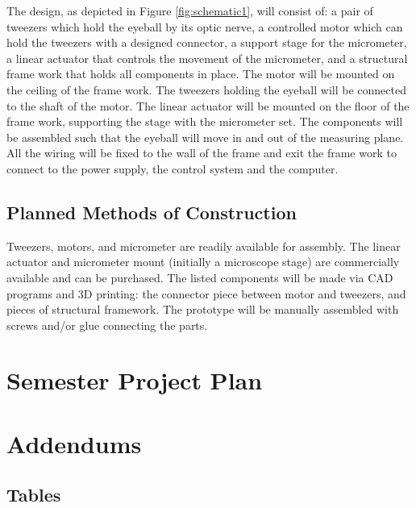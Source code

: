 \documentclass{article}
\begin{document}
The design, as depicted in Figure \ref{fig:schematic1}, will consist of: a pair of tweezers which hold the eyeball by its optic nerve, a controlled motor which can hold the tweezers with a designed connector, a support stage for the micrometer, a linear actuator that controls the movement of the micrometer, and a structural frame work that holds all components in place. The motor will be mounted on the ceiling of the frame work. The tweezers holding the eyeball will be connected to the shaft of the motor. The linear actuator will be mounted on the floor of the frame work, supporting the stage with the micrometer set. The components will be assembled such that the eyeball will move in and out of the measuring plane. All the wiring will be fixed to the wall of the frame and exit the frame work to connect to the power supply, the control system and the computer.

\subsection{Planned Methods of Construction}
Tweezers, motors, and micrometer are readily available for assembly. The linear actuator and micrometer mount (initially a microscope stage) are commercially available and can be purchased. The listed components will be made via CAD programs and 3D printing: the connector piece between motor and tweezers, and pieces of structural framework. The prototype will be manually assembled with screws and/or glue connecting the parts.

\section{Semester Project Plan}

\newpage


\newpage

\section{Addendums}
\label{sec:addendums}

\subsection{Tables}
\label{sec:tables}
\end{document}
